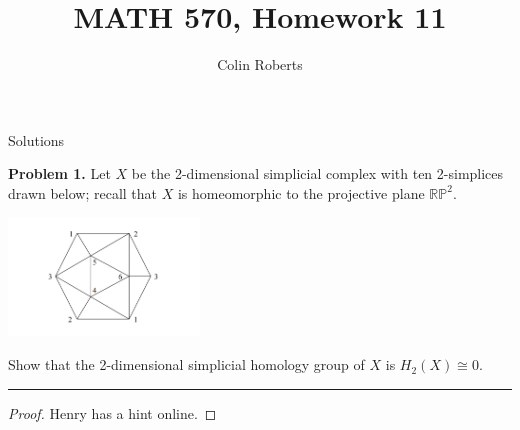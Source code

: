 \documentclass[leqno]{article}
\author{Colin Roberts}
\title{MATH 570, Homework 11}
\theoremstyle{nonumberplain}
\newtheorem{proof}{Proof}
\newcommand{\RP}{\ensuremath{\mathbb{RP}}}
\begin{document}
\maketitle
\begin{large}
\begin{center}
Solutions
\end{center}
\end{large}
\pagebreak


\noindent\textbf{Problem 1.} Let $X$ be the 2-dimensional simplicial complex with ten 2-simplices drawn below; recall that $X$ is homeomorphic to the projective plane $\RP^2$.
\begin{center} \includegraphics[width=2in]{projective_plane.png} \end{center}
Show that the 2-dimensional simplicial homology group of $X$ is $H_2(X)\cong0$.

\noindent\rule[0.5ex]{\linewidth}{1pt}

\begin{proof}
Henry has a hint online.
\end{proof}

\pagebreak

\end{document}
